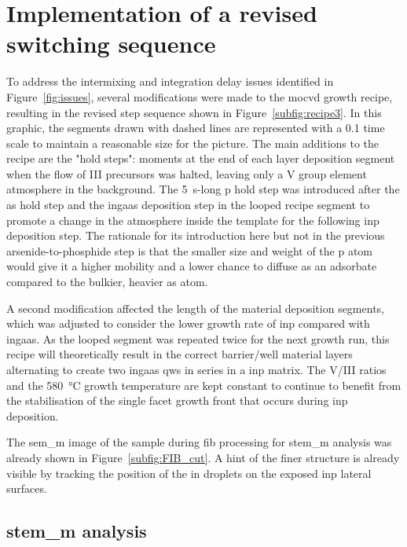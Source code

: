 \section{Implementation of a revised switching sequence}
\label{sec:s3}

To address the intermixing and integration delay issues identified in Figure~\ref{fig:issues}, several modifications were made to the \acs{mocvd} growth recipe, resulting in the revised step sequence shown in Figure~\ref{subfig:recipe3}. In this graphic, the segments drawn with dashed lines are represented with a \num{0.1} time scale to maintain a reasonable size for the picture. The main additions to the recipe are the "hold steps": moments at the end of each layer deposition segment when the flow of III precursors was halted, leaving only a V group element atmosphere in the background. The \qty{5}{s}-long \acl{p} hold step was introduced after the \acl{as} hold step and the \acs{ingaas} deposition step in the looped recipe segment to promote a change in the atmosphere inside the template for the following \acs{inp} deposition step. The rationale for its introduction here but not in the previous arsenide-to-phosphide step is that the smaller size and weight of the \acl{p} atom would give it a higher mobility and a lower chance to diffuse as an adsorbate compared to the bulkier, heavier \acl{as} atom. 

A second modification affected the length of the material deposition segments, which was adjusted to consider the lower growth rate of \acs{inp} compared with \acs{ingaas}. As the looped segment was repeated twice for the next growth run, this recipe will theoretically result in the correct barrier/well material layers alternating to create two \acs{ingaas} \acl{qw}s in series in a \acs{inp} matrix. The V/III ratios and the \qty{580}{\degreeCelsius} growth temperature are kept constant to continue to benefit from the stabilisation of the single  facet growth front that occurs during \acs{inp} deposition.

The \acs{sem_m} image of the sample during \acs{fib} processing for \acs{stem_m} analysis was already shown in Figure~\ref{subfig:FIB_cut}. A hint of the finer structure is already visible by tracking the position of the \acl{in} droplets on the exposed \acs{inp} lateral surfaces.

\subsection{\texorpdfstring{\acs{stem_m} analysis}{STEM analysis}}

